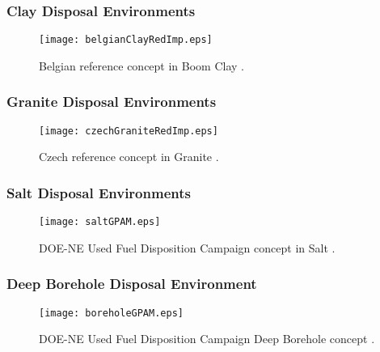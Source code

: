

\begin{frame}[ctb!]
  \frametitle{Clay Disposal Environments}

  \begin{figure}[h!]
    \begin{center}
      \texttt{[image: belgianClayRedImp.eps]}
    \end{center}
    \caption{Belgian reference concept in Boom Clay 
    \cite{von_lensa_red-impact_2005}.}
    \label{fig:belgianClayRedImp}
  \end{figure}

\end{frame}

\begin{frame}[ctb!]
  \frametitle{Granite Disposal Environments}

  \begin{figure}[h!]
    \begin{center}
      \texttt{[image: czechGraniteRedImp.eps]}
    \end{center}
    \caption{Czech reference concept in Granite 
    \cite{von_lensa_red-impact_2005}.}
    \label{fig:czechGraniteRedImp}
  \end{figure}

\end{frame}

\begin{frame}[ctb!]
  \frametitle{Salt Disposal Environments}

  \begin{figure}[h!]
    \begin{center}
      \texttt{[image: saltGPAM.eps]}
    \end{center}
    \caption{DOE-NE Used Fuel Disposition Campaign  concept in 
    Salt \cite{clayton_generic_2010}.}
    \label{fig:saltGPAM}
  \end{figure}

\end{frame}

\begin{frame}[ctb!]
  \frametitle{Deep Borehole Disposal Environment}

  \begin{figure}[h!]
    \begin{center}
      \texttt{[image: boreholeGPAM.eps]}
    \end{center}
    \caption{DOE-NE Used Fuel Disposition Campaign Deep Borehole concept 
    \cite{clayton_generic_2010}.}
    \label{fig:boreholeGPAM}
  \end{figure}

\end{frame}


